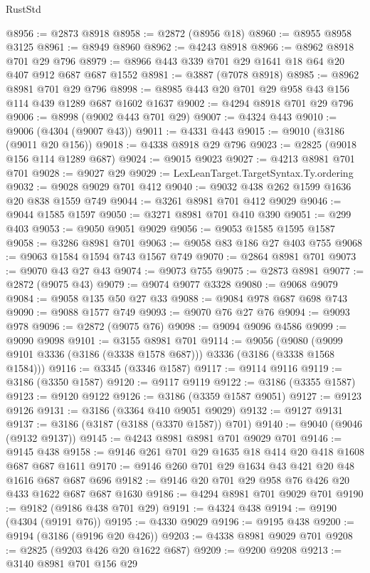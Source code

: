 \begin{lexlean}{RustStd}
\begin{coremodule}
@8956 := @2873 @8918
@8958 := @2872 (@8956 @18)
@8960 := @8955 @8958 @3125
@8961 := @8949 @8960
@8962 := @4243 @8918
@8966 := @8962 @8918 @701 @29 @796
@8979 := @8966 @443 @339 @701 @29 @1641 @18 @64 @20 @407 @912 @687 @687 @1552
@8981 := @3887 (@7078 @8918)
@8985 := @8962 @8981 @701 @29 @796
@8998 := @8985 @443 @20 @701 @29 @958 @43 @156 @114 @439 @1289 @687 @1602 @1637
@9002 := @4294 @8918 @701 @29 @796
@9006 := @8998 (@9002 @443 @701 @29)
@9007 := @4324 @443
@9010 := @9006 (@4304 (@9007 @43))
@9011 := @4331 @443
@9015 := @9010 (@3186 (@9011 @20 @156))
@9018 := @4338 @8918 @29 @796
@9023 := @2825 (@9018 @156 @114 @1289 @687)
@9024 := @9015 @9023
@9027 := @4213 @8981 @701 @701
@9028 := @9027 @29
@9029 := LexLeanTarget.TargetSyntax.Ty.ordering
@9032 := @9028 @9029 @701 @412
@9040 := @9032 @438 @262 @1599 @1636 @20 @838 @1559 @749
@9044 := @3261 @8981 @701 @412 @9029
@9046 := @9044 @1585 @1597
@9050 := @3271 @8981 @701 @410 @390
@9051 := @299 @403
@9053 := @9050 @9051 @9029
@9056 := @9053 @1585 @1595 @1587
@9058 := @3286 @8981 @701
@9063 := @9058 @83 @186 @27 @403 @755
@9068 := @9063 @1584 @1594 @743 @1567 @749
@9070 := @2864 @8981 @701
@9073 := @9070 @43 @27 @43
@9074 := @9073 @755
@9075 := @2873 @8981
@9077 := @2872 (@9075 @43)
@9079 := @9074 @9077 @3328
@9080 := @9068 @9079
@9084 := @9058 @135 @50 @27 @33
@9088 := @9084 @978 @687 @698 @743
@9090 := @9088 @1577 @749
@9093 := @9070 @76 @27 @76
@9094 := @9093 @978
@9096 := @2872 (@9075 @76)
@9098 := @9094 @9096 @4586
@9099 := @9090 @9098
@9101 := @3155 @8981 @701
@9114 := @9056
    (@9080 (@9099 @9101 @3336 (@3186 (@3338 @1578 @687))) @3336 (@3186 (@3338 @1568 @1584)))
@9116 := @3345 (@3346 @1587)
@9117 := @9114 @9116
@9119 := @3186 (@3350 @1587)
@9120 := @9117 @9119
@9122 := @3186 (@3355 @1587)
@9123 := @9120 @9122
@9126 := @3186 (@3359 @1587 @9051)
@9127 := @9123 @9126
@9131 := @3186 (@3364 @410 @9051 @9029)
@9132 := @9127 @9131
@9137 := @3186 (@3187 (@3188 (@3370 @1587)) @701)
@9140 := @9040 (@9046 (@9132 @9137))
@9145 := @4243 @8981 @8981 @701 @9029 @701
@9146 := @9145 @438
@9158 := @9146 @261 @701 @29 @1635 @18 @414 @20 @418 @1608 @687 @687 @1611
@9170 := @9146 @260 @701 @29 @1634 @43 @421 @20 @48 @1616 @687 @687 @696
@9182 := @9146 @20 @701 @29 @958 @76 @426 @20 @433 @1622 @687 @687 @1630
@9186 := @4294 @8981 @701 @9029 @701
@9190 := @9182 (@9186 @438 @701 @29)
@9191 := @4324 @438
@9194 := @9190 (@4304 (@9191 @76))
@9195 := @4330 @9029
@9196 := @9195 @438
@9200 := @9194 (@3186 (@9196 @20 @426))
@9203 := @4338 @8981 @9029 @701
@9208 := @2825 (@9203 @426 @20 @1622 @687)
@9209 := @9200 @9208
@9213 := @3140 @8981 @701 @156 @29

\end{coremodule}
\end{lexlean}
